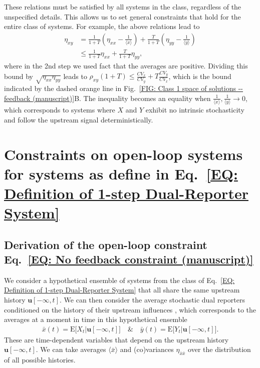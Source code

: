 \documentclass[%
 reprint,prx,
superscriptaddress,
%
%
%
%
%
%
%
%
%
 amsmath,amssymb,
 aps,
%
%
%
%
%
%
]{revtex4-2}
\newcommand{\lb}{\langle}
\newcommand{\rb}{\rangle}
\begin{document}
These relations must be satisfied by all systems in the class, regardless of the unspecified details. This allows us to set general constraints 
that hold for the entire class of systems. For example, the above relations lead to
\begin{align*}
\eta_{xy} 
	  &= \frac{1}{1+T}\left(\eta_{xx} - \frac{1}{\lb x \rb}\right) + \frac{T}{1+T}\left(\eta_{yy} - \frac{1}{\lb y \rb}\right) \\
	  &\leq \frac{1}{1+T}\eta_{xx} + \frac{T}{1+T}\eta_{yy} ,
\end{align*}
where in the 2nd step we used  fact that the averages are positive. Dividing this bound by $\sqrt{\eta_{xx}\eta_{yy}}$ leads to $
\rho_{xy}(1+T) \leqslant \frac{CV_{x}}{CV_{y}}  + T\frac{CV_{y}}{CV_{x}}$, 
which is the bound indicated by the dashed orange line in Fig.~\ref{FIG: Class 1 space of solutions -- feedback (manuscript)}B. The inequality becomes an equality when $\frac{1}{\lb x \rb}, \frac{1}{\lb y \rb} \to 0$, which 
corresponds to systems where $X$ and $Y$ exhibit no intrinsic stochasticity and follow the upstream signal deterministically. 



%

%
%
%
%
%
%
\section{Constraints on open-loop systems for systems as define in Eq.~\eqref{EQ: Definition of 1-step Dual-Reporter System}} \label{Appendix section on open-loop constraint}


\subsection{Derivation of  the open-loop constraint  Eq.~\eqref{EQ: No feedback constraint (manuscript)}}
We consider a hypothetical ensemble of systems from the class of Eq.~\eqref{EQ: Definition of 1-step Dual-Reporter System} that all share the same upstream history $\mathbf{u}[-\infty,t]$.  We can then consider the average stochastic dual reporters conditioned on
the history of their upstream influences \cite{Hilfinger2011, Hilfinger2012}, which corresponds to the averages at a moment in time in this hypothetical ensemble
\begin{align*}
\bar{x}(t) = \mathrm{E}\big[ X_{t}|\mathbf{u}[-\infty,t] \big] \quad  \text{\&} \quad  \bar{y}(t) = \mathrm{E}\big[ Y_{t}|\mathbf{u}[-\infty,t] \big].
\end{align*}
These are time-dependent variables that depend on the upstream history $\mathbf{u}[-\infty,t]$. We can take averages $\langle \bar{x} \rangle$ and (co)variances $\eta_{\bar{x}\bar{x}}$ over the distribution of all possible histories. 
\end{document}
